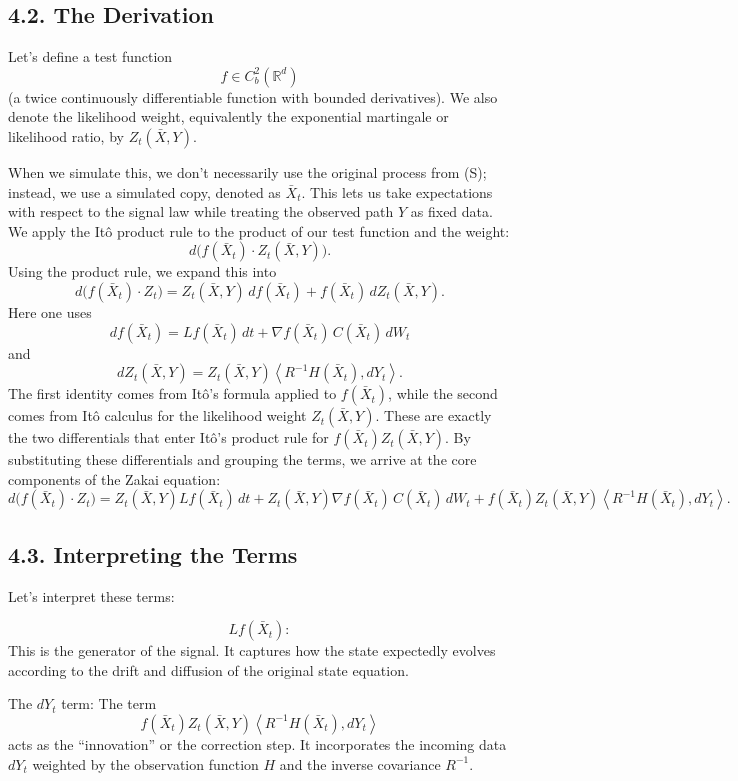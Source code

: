 \documentclass[11pt]{article}
\theoremstyle{definition}
\theoremstyle{remark}
\begin{document}
\subsection*{4.2. The Derivation}
Let's define a test function
\[
f\in C_b^2(\mathbb R^d)
\]
(a twice continuously differentiable function with bounded derivatives). We also denote the likelihood weight, equivalently the exponential martingale or likelihood ratio, by $Z_t(\bar X,Y)$.

When we simulate this, we don't necessarily use the original process from (S); instead, we use a simulated copy, denoted as $\bar X_t$. This lets us take expectations with respect to the signal law while treating the observed path $Y$ as fixed data. We apply the It\^o product rule to the product of our test function and the weight:
\[
d\bigl(f(\bar X_t)\cdot Z_t(\bar X,Y)\bigr).
\]
Using the product rule, we expand this into
\[
d\bigl(f(\bar X_t)\cdot Z_t\bigr)=Z_t(\bar X,Y)\,df(\bar X_t)+f(\bar X_t)\,dZ_t(\bar X,Y).
\]
Here one uses
\[
df(\bar X_t)=Lf(\bar X_t)\,dt+\nabla f(\bar X_t)\,C(\bar X_t)\,dW_t
\]
and
\[
dZ_t(\bar X,Y)=Z_t(\bar X,Y)\left\langle R^{-1}H(\bar X_t),dY_t\right\rangle.
\]
The first identity comes from It\^o's formula applied to $f(\bar X_t)$, while the second comes from It\^o calculus for the likelihood weight $Z_t(\bar X,Y)$. These are exactly the two differentials that enter It\^o's product rule for $f(\bar X_t)Z_t(\bar X,Y)$.
By substituting these differentials and grouping the terms, we arrive at the core components of the Zakai equation:
\[
d\bigl(f(\bar X_t)\cdot Z_t\bigr)
=
Z_t(\bar X,Y)Lf(\bar X_t)\,dt
+Z_t(\bar X,Y)\nabla f(\bar X_t)\,C(\bar X_t)\,dW_t
+f(\bar X_t)Z_t(\bar X,Y)\left\langle R^{-1}H(\bar X_t),dY_t\right\rangle.
\]

\subsection*{4.3. Interpreting the Terms}
Let's interpret these terms:

\[
Lf(\bar X_t):
\]
This is the generator of the signal. It captures how the state expectedly evolves according to the drift and diffusion of the original state equation.

The $dY_t$ term: The term
\[
f(\bar X_t)Z_t(\bar X,Y)\left\langle R^{-1}H(\bar X_t),dY_t\right\rangle
\]
acts as the ``innovation'' or the correction step. It incorporates the incoming data $dY_t$ weighted by the observation function $H$ and the inverse covariance $R^{-1}$.
\end{document}
